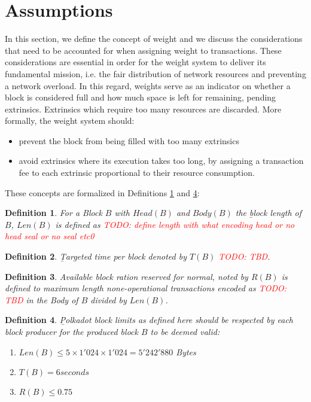 \documentclass[11pt,a4paper]{article}
\newtheorem{definition}{Definition}
\newcommand{\todo}[1]{\textcolor{red}{TODO: #1}}
\begin{document}
\section{Assumptions}\label{sec:assumptions}

In this section, we define the concept of weight and we discuss the considerations that need to be accounted for when assigning weight to transactions. These considerations are essential in order for the weight system to deliver its fundamental mission, i.e. the fair distribution of network resources and preventing a network overload. In this regard, weights serve as an indicator on whether a block is considered full and how much space is left for remaining, pending extrinsics. Extrinsics which require too many resources are
discarded. More formally, the weight system should:

\begin{itemize}
\item prevent the block from being filled with too many extrinsics
\item avoid extrinsics where its execution takes too long, by assigning a transaction fee to each extrinsic proportional to their resource consumption.
\end{itemize}

These concepts are formalized in Definitions \ref{def:block-length} and \ref{def:polkadot-block-limits}:

\begin{definition}
  \label{def:block-length}
  For a Block $B$ with $Head(B)$ and $Body(B)$ the {\b block length of $B$}, $Len(B)$ is defined as \todo{define length with what encoding head or no head seal or no seal etc0}
\end{definition}

\begin{definition}
  \label{def:target-time-per-block}
  {\b Targeted time per block} denoted by $T(B)$ \todo{TBD}.
\end{definition}

\begin{definition}
  \label{def:block-target-time}
  Available block ration reserved for normal, noted by $R(B)$ is defined to maximum length none-operational transactions encoded as
  \todo{TBD} in the Body of $B$ divided by $Len(B)$.
\end{definition}

\begin{definition}
  \label{def:polkadot-block-limits}
        {\b Polkadot block limits} as defined here should be respected by each block producer for the produced block $B$ to be deemed valid:
        
        \begin{enumerate}
         \item $Len(B) \le 5 \times 1'024 \times 1'024 = 5'242'880$ Bytes
         \item $T(B) = 6 seconds$
         \item $R(B) \le 0.75$
        \end{enumerate}
        
\end{definition}
\end{document}
